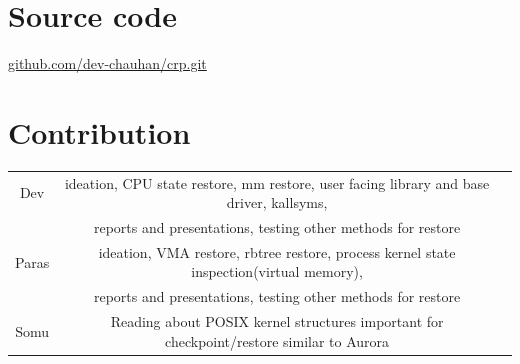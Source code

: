 \documentclass[a4paper,12pt]{article}
\begin{document}



\section{Source code}

\href{https://github.com/dev-chauhan/crp.git}{github.com/dev-chauhan/crp.git}

\section{Contribution}

\begin{center}
\begin{tabular}{ |c|c|c| } 
 \hline
 Dev & ideation, CPU state restore, mm restore, user facing library and base driver, kallsyms, \\
    &   reports and presentations, testing other methods for restore \\
 \hline
 Paras & ideation, VMA restore, rbtree restore, process kernel state inspection(virtual memory), \\
 & reports and presentations, testing other methods for restore \\
 \hline
 Somu &    Reading about POSIX kernel structures important for checkpoint/restore similar to Aurora\\
 \hline
\end{tabular}
\end{center}
\end{document}
